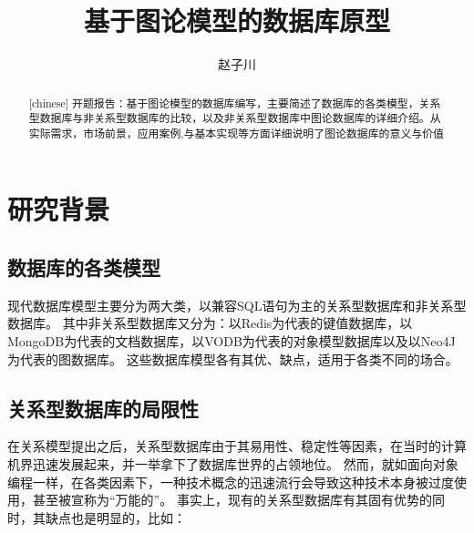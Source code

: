 \documentclass[a4paper]{ecust_thesis_openning}
\author{赵子川}
\title{基于图论模型的数据库原型}
\begin{document}
\setlength{\parindent}{2em}


\maketitle

\begin{abstract}[chinese]
    开题报告：基于图论模型的数据库编写，主要简述了数据库的各类模型，关系型数据库与非关系型数据库的比较，以及非关系型数据库中图论数据库的详细介绍。从实际需求，市场前景，应用案例,与基本实现等方面详细说明了图论数据库的意义与价值
\end{abstract}

\section{研究背景}
	\subsection{数据库的各类模型}
		现代数据库模型主要分为两大类，以兼容SQL语句为主的关系型数据库和非关系型数据库。\newline
		其中非关系型数据库又分为：以Redis为代表的键值数据库，以MongoDB为代表的文档数据库，以VODB为代表的对象模型数据库以及以Neo4J为代表的图数据库。\newline
		这些数据库模型各有其优、缺点，适用于各类不同的场合。

	\subsection{关系型数据库的局限性}
		在关系模型提出之后，关系型数据库由于其易用性、稳定性等因素，在当时的计算机界迅速发展起来，并一举拿下了数据库世界的占领地位。 \newline
		然而，就如面向对象编程一样，在各类因素下，一种技术概念的迅速流行会导致这种技术本身被过度使用，甚至被宣称为“万能的”。 事实上，现有的关系型数据库有其固有优势的同时，其缺点也是明显的，比如：\newline
\end{document}
